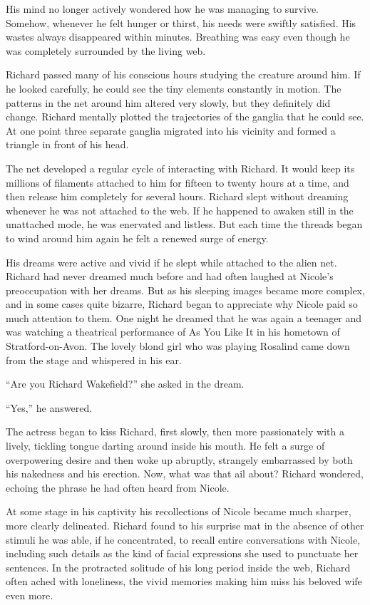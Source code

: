 \documentclass[]{article}
\begin{document}
{{His mind no longer actively wondered how he was managing to survive. Somehow, whenever he felt hunger or thirst, his needs were swiftly satisfied. His wastes always disappeared within minutes. Breathing was easy even though he was completely surrounded by the living web.

Richard passed many of his conscious hours studying the creature around him. If he looked carefully, he could see the tiny elements constantly in motion. The patterns in the net around him altered very slowly, but they definitely did change. Richard mentally plotted the trajectories of the ganglia that he could see. At one point three separate ganglia migrated into his vicinity and formed a triangle in front of his head.

The net developed a regular cycle of interacting with Richard. It would keep its millions of filaments attached to him for fifteen to twenty hours at a time, and then release him completely for several hours. Richard slept without dreaming whenever he was not attached to the web. If he happened to awaken still in the unattached mode, he was enervated and listless. But each time the threads began to wind around him again he felt a renewed surge of energy.

His dreams were active and vivid if he slept while attached to the alien net. Richard had never dreamed much before and had often laughed at Nicole’s preoccupation with her dreams. But as his sleeping images became more complex, and in some cases quite bizarre, Richard began to appreciate why Nicole paid so much attention to them. One night he dreamed that he was again a teenager and was watching a theatrical performance of As You Like It in his hometown of Stratford-on-Avon. The lovely blond girl who was playing Rosalind came down from the stage and whispered in his ear.

“Are you Richard Wakefield?” she asked in the dream.

“Yes,” he answered.

The actress began to kiss Richard, first slowly, then more passionately with a lively, tickling tongue darting around inside his mouth. He felt a surge of overpowering desire and then woke up abruptly, strangely embarrassed by both his nakedness and his erection. Now, what was that ail about? Richard wondered, echoing the phrase he had often heard from Nicole.

At some stage in his captivity his recollections of Nicole became much sharper, more clearly delineated. Richard found to his surprise mat in the absence of other stimuli he was able, if he concentrated, to recall entire conversations with Nicole, including such details as the kind of facial expressions she used to punctuate her sentences. In the protracted solitude of his long period inside the web, Richard often ached with loneliness, the vivid memories making him miss his beloved wife even more.

}}
\end{document}
